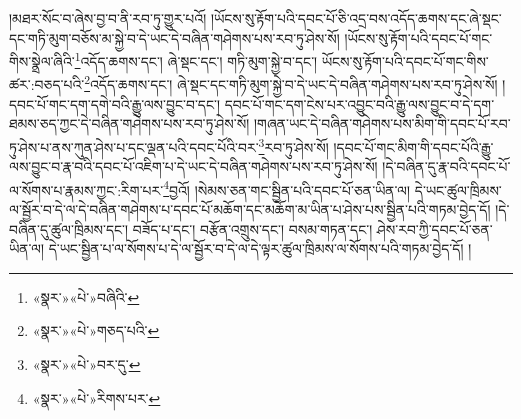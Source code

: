 །མཐར་སོང་བ་ཞེས་བྱ་བ་ནི་རབ་ཏུ་གྱུར་པའོ། །ཡོངས་སུ་རྟོག་པའི་དབང་པོ་ཅི་འདྲ་བས་འདོད་ཆགས་དང་ཞེ་སྡང་དང་གཏི་མུག་བཅོས་མ་སྐྱེ་བ་དེ་ཡང་དེ་བཞིན་གཤེགས་པས་རབ་ཏུ་ཤེས་སོ། །ཡོངས་སུ་རྟོག་པའི་དབང་པོ་གང་གིས་སྣྲེལ་ཞིའི་\footnote{«སྣར་»«པེ་»བཞིའི་}འདོད་ཆགས་དང་། ཞེ་སྡང་དང་། གཏི་མུག་སྐྱེ་བ་དང་། ཡོངས་སུ་རྟོག་པའི་དབང་པོ་གང་གིས་ཚར་:བཅད་པའི་\footnote{«སྣར་»«པེ་»གཅད་པའི་}འདོད་ཆགས་དང་། ཞེ་སྡང་དང་གཏི་མུག་སྐྱེ་བ་དེ་ཡང་དེ་བཞིན་གཤེགས་པས་རབ་ཏུ་ཤེས་སོ། །དབང་པོ་གང་དག་དགེ་བའི་རྒྱུ་ལས་བྱུང་བ་དང་། དབང་པོ་གང་དག་ངེས་པར་འབྱུང་བའི་རྒྱུ་ལས་བྱུང་བ་དེ་དག་ཐམས་ཅད་ཀྱང་དེ་བཞིན་གཤེགས་པས་རབ་ཏུ་ཤེས་སོ། །གཞན་ཡང་དེ་བཞིན་གཤེགས་པས་མིག་གི་དབང་པོ་རབ་ཏུ་ཤེས་པ་ནས་ཀུན་ཤེས་པ་དང་ལྡན་པའི་དབང་པོའི་བར་\footnote{«སྣར་»«པེ་»བར་དུ་}རབ་ཏུ་ཤེས་སོ། །དབང་པོ་གང་མིག་གི་དབང་པོའི་རྒྱུ་ལས་བྱུང་བ་རྣ་བའི་དབང་པོ་འཇིག་པ་དེ་ཡང་དེ་བཞིན་གཤེགས་པས་རབ་ཏུ་ཤེས་སོ། །དེ་བཞིན་དུ་རྣ་བའི་དབང་པོ་ལ་སོགས་པ་རྣམས་ཀྱང་:རིག་པར་\footnote{«སྣར་»«པེ་»རིགས་པར་}བྱའོ། །སེམས་ཅན་གང་སྦྱིན་པའི་དབང་པོ་ཅན་ཡིན་ལ། དེ་ཡང་ཚུལ་ཁྲིམས་ལ་སྦྱོར་བ་དེ་ལ་དེ་བཞིན་གཤེགས་པ་དབང་པོ་མཆོག་དང་མཆོག་མ་ཡིན་པ་ཤེས་པས་སྦྱིན་པའི་གཏམ་བྱེད་དོ། །དེ་བཞིན་དུ་ཚུལ་ཁྲིམས་དང་། བཟོད་པ་དང་། བརྩོན་འགྲུས་དང་། བསམ་གཏན་དང་། ཤེས་རབ་ཀྱི་དབང་པོ་ཅན་ཡིན་ལ། དེ་ཡང་སྦྱིན་པ་ལ་སོགས་པ་དེ་ལ་སྦྱོར་བ་དེ་ལ་དེ་ལྟར་ཚུལ་ཁྲིམས་ལ་སོགས་པའི་གཏམ་བྱེད་དོ། །
